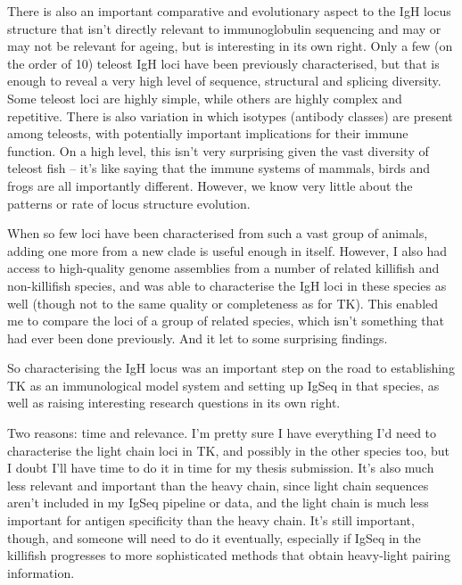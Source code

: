 There is also an important comparative and evolutionary aspect to the IgH locus structure that isn't directly relevant to immunoglobulin sequencing and may or may not be relevant for ageing, but is interesting in its own right. Only a few (on the order of 10) teleost IgH loci have been previously characterised, but that is enough to reveal a very high level of sequence, structural and splicing diversity. Some teleost loci are highly simple, while others are highly complex and repetitive. There is also variation in which isotypes (antibody classes) are present among teleosts, with potentially important implications for their immune function. On a high level, this isn't very surprising given the vast diversity of teleost fish -- it's like saying that the immune systems of mammals, birds and frogs are all importantly different. However, we know very little about the patterns or rate of locus structure evolution.

When so few loci have been characterised from such a vast group of animals, adding one more from a new clade is useful enough in itself. However, I also had access to high-quality genome assemblies from a number of related killifish and non-killifish species, and was able to characterise the IgH loci in these species as well (though not to the same quality or completeness as for TK). This enabled me to compare the loci of a group of related species, which isn't something that had ever been done previously. And it let to some surprising findings.

So characterising the IgH locus was an important step on the road to establishing TK as an immunological model system and setting up IgSeq in that species, as well as raising interesting research questions in its own right.


Two reasons: time and relevance. I'm pretty sure I have everything I'd need to characterise the light chain loci in TK, and possibly in the other species too, but I doubt I'll have time to do it in time for my thesis submission. It's also much less relevant and important than the heavy chain, since light chain sequences aren't included in my IgSeq pipeline or data, and the light chain is much less important for antigen specificity than the heavy chain. It's still important, though, and someone will need to do it eventually, especially if IgSeq in the killifish progresses to more sophisticated methods that obtain heavy-light pairing information. 

